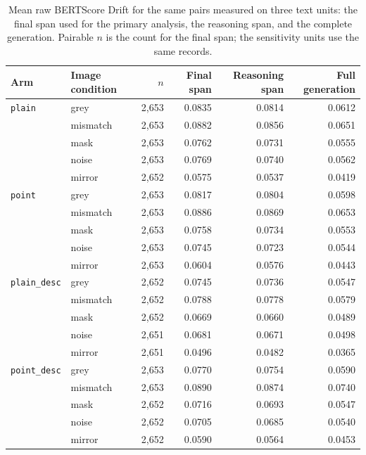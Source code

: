 \begin{table}[ht]
\centering
\caption[Drift by rationale text unit]{Mean raw BERTScore Drift for the same pairs measured on three text units: the final span used for the primary analysis, the reasoning span, and the complete generation. Pairable $n$ is the count for the final span; the sensitivity units use the same records.}
\label{tab:app-rq2-text-unit}
\begin{tabular}{llrrrr}
\toprule
Arm & Image condition & $n$ & Final span & Reasoning span & Full generation \\
\midrule
\texttt{plain} & grey & 2,653 & 0.0835 & 0.0814 & 0.0612 \\
 & mismatch & 2,653 & 0.0882 & 0.0856 & 0.0651 \\
 & mask & 2,653 & 0.0762 & 0.0731 & 0.0555 \\
 & noise & 2,653 & 0.0769 & 0.0740 & 0.0562 \\
 & mirror & 2,652 & 0.0575 & 0.0537 & 0.0419 \\
\texttt{point} & grey & 2,653 & 0.0817 & 0.0804 & 0.0598 \\
 & mismatch & 2,653 & 0.0886 & 0.0869 & 0.0653 \\
 & mask & 2,653 & 0.0758 & 0.0734 & 0.0553 \\
 & noise & 2,653 & 0.0745 & 0.0723 & 0.0544 \\
 & mirror & 2,653 & 0.0604 & 0.0576 & 0.0443 \\
\texttt{plain\_desc} & grey & 2,652 & 0.0745 & 0.0736 & 0.0547 \\
 & mismatch & 2,652 & 0.0788 & 0.0778 & 0.0579 \\
 & mask & 2,652 & 0.0669 & 0.0660 & 0.0489 \\
 & noise & 2,651 & 0.0681 & 0.0671 & 0.0498 \\
 & mirror & 2,651 & 0.0496 & 0.0482 & 0.0365 \\
\texttt{point\_desc} & grey & 2,653 & 0.0770 & 0.0754 & 0.0590 \\
 & mismatch & 2,653 & 0.0890 & 0.0874 & 0.0740 \\
 & mask & 2,652 & 0.0716 & 0.0693 & 0.0547 \\
 & noise & 2,652 & 0.0705 & 0.0685 & 0.0540 \\
 & mirror & 2,652 & 0.0590 & 0.0564 & 0.0453 \\
\bottomrule
\end{tabular}
\end{table}

